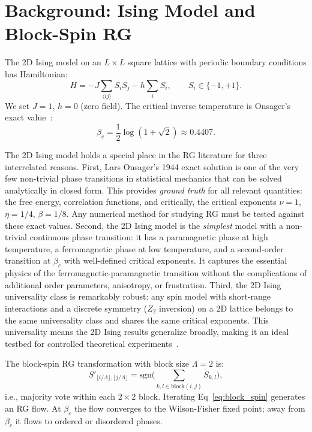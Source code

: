 \documentclass[12pt,a4paper]{memoir}
\begin{document}
\section{Background: Ising Model and Block-Spin RG}
\label{sec:bg}

The 2D Ising model on an $L \times L$ square lattice with periodic
boundary conditions has Hamiltonian:
\begin{equation}
    H = -J\sum_{\langle ij\rangle} S_i S_j - h\sum_i S_i,
    \qquad S_i \in \{-1, +1\}.
    \label{eq:ising}
\end{equation}
We set $J=1$, $h=0$ (zero field).  The critical inverse temperature is
Onsager's exact value~\citep{onsager1944}:
\begin{equation}
    \beta_c = \frac{1}{2}\log(1+\sqrt{2}) \approx 0.4407.
    \label{eq:onsager}
\end{equation}

The 2D Ising model holds a special place in the RG literature for three
interrelated reasons.  First, Lars Onsager's 1944 exact solution is one of the
very few non-trivial phase transitions in statistical mechanics that can be
solved analytically in closed form.  This provides \emph{ground truth} for all
relevant quantities: the free energy, correlation functions, and critically,
the critical exponents $\nu=1$, $\eta=1/4$, $\beta=1/8$.  Any numerical method
for studying RG must be tested against these exact values.  Second, the 2D
Ising model is the \emph{simplest} model with a non-trivial continuous phase
transition: it has a paramagnetic phase at high temperature, a ferromagnetic
phase at low temperature, and a second-order transition at $\beta_c$ with
well-defined critical exponents.  It captures the essential physics of the
ferromagnetic-paramagnetic transition without the complications of additional
order parameters, anisotropy, or frustration.  Third, the 2D Ising universality
class is remarkably robust: any spin model with short-range interactions and a
discrete symmetry ($Z_2$ inversion) on a 2D lattice belongs to the same
universality class and shares the same critical exponents.  This universality
means the 2D Ising results generalize broadly, making it an ideal testbed for
controlled theoretical experiments~\citep{goldenfeld1992,amit2005,cardy1996}.

The block-spin RG transformation with block size $\Lambda=2$ is:
\begin{equation}
    S'_{\lfloor i/\Lambda \rfloor, \lfloor j/\Lambda \rfloor}
    = \mathrm{sgn}\!\Big(\sum_{k,l \in \mathrm{block}(i,j)} S_{k,l}\Big),
    \label{eq:block_spin}
\end{equation}
i.e., majority vote within each $2\times2$ block.  Iterating
Eq~\eqref{eq:block_spin} generates an RG flow.  At $\beta_c$ the flow
converges to the Wilson-Fisher fixed point; away from $\beta_c$ it flows
to ordered or disordered phases.
\end{document}
